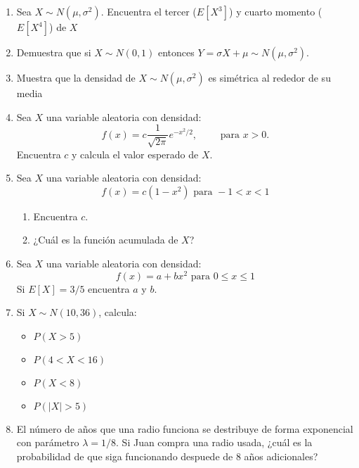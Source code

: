 \documentclass{report}
\begin{document}
\begin{enumerate}
    \item Sea $X\sim N(\mu,\sigma^2)$. Encuentra el tercer ($E\left[X^3\right]$) y  cuarto momento ($E\left[X^4\right]$)  de $X$

    \item Demuestra que si $X\sim N(0,1)$ entonces $Y = \sigma X + \mu \sim N(\mu,\sigma^2) $.
    \item Muestra que la densidad de $X\sim N(\mu,\sigma^2)$ es simétrica al rededor de su media

    \item Sea $X$ una variable aleatoria con densidad:
          $$
              f(x) = c\frac{1}{\sqrt{2\pi}}e^{-x^2/2}, \qquad \text{ para } x>0.
          $$
          Encuentra $c$ y calcula el valor esperado de $X$.
    \item Sea $X$ una variable aleatoria con densidad:
          $$
              f(x)=c(1-x^2) \text{ para } -1 < x <1
          $$
          \begin{enumerate}
              \item Encuentra $c$.
              \item ¿Cuál es la función acumulada de $X$?
          \end{enumerate}
    \item Sea $X$ una variable aleatoria con densidad:
          $$
              f(x)= a+bx^2 \text{ para }0\leq x\leq 1
          $$
          Si $E[X]=3/5$ encuentra $a$ y $b$.

    \item Si $X\sim N(10, 36)$, calcula:
          \begin{itemize}
              \item $P(X > 5)$
              \item $P(4 < X < 16)$
              \item $P(X<8)$
              \item $P(\vert X\vert > 5)$
          \end{itemize}
    \item El número de años que una radio funciona se destribuye de forma exponencial con parámetro $\lambda=1/8$. Si Juan compra una radio usada, ¿cuál es la probabilidad de que siga funcionando despuede de 8 años adicionales?



\end{enumerate}
\end{document}
